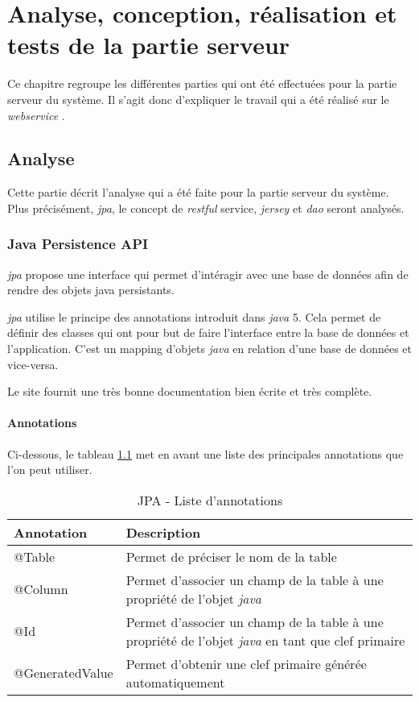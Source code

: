
\chapter{Analyse, conception, réalisation et tests de la partie serveur}
\label{cha:analyse_serveur}
Ce chapitre regroupe les différentes parties qui ont été effectuées pour la partie serveur du système. Il s'agit donc d'expliquer le travail qui a été réalisé sur le \emph{\gls{webservice}} .
\section{Analyse} %
\label{sec:analyse_serveur}
Cette partie décrit l'analyse qui a été faite pour la partie serveur du système. Plus précisément, \emph{\gls{jpa}}, le concept de \emph{\gls{rest}ful} service, \emph{\gls{jersey}} et \emph{\gls{dao}} seront analysés.
\subsection{Java Persistence API} %
\label{sub:jpa}
\emph{\gls{jpa}} propose une interface qui permet d'intéragir avec une base de données afin de rendre des objets \gls{java} persistants. 

\medskip

\emph{\gls{jpa}} utilise le principe des annotations introduit dans \emph{\gls{java}} 5. Cela permet de définir des classes qui ont pour but de faire l'interface entre la base de données et l'application. C'est un mapping d'objets \emph{\gls{java}} en relation d'une base de données et vice-versa.

\medskip

Le site \cite{online:jpadoudou} fournit une très bonne documentation bien écrite et très complète.

\subsubsection{Annotations}
Ci-dessous, le tableau \ref{tab:jpaannot} met en avant une liste des principales annotations que l'on peut utiliser.

\begin{table}[H]
\begin{tabularx}{\textwidth}{|m{3cm}|X|}
  \hline
  \bf{Annotation} & \bf{Description} \\
  \hline
  @Table & Permet de préciser le nom de la table \\
  \hline  
  @Column & Permet d'associer un champ de la table à une propriété de l'objet \emph{\gls{java}} \\
  \hline  
  @Id & Permet d'associer un champ de la table à une propriété de l'objet \emph{\gls{java}} en tant que clef primaire \\
  \hline
  @GeneratedValue & Permet d'obtenir une clef primaire générée automatiquement \\
  \hline   
\end{tabularx}
\caption{JPA - Liste d'annotations}
\label{tab:jpaannot}
\end{table}

